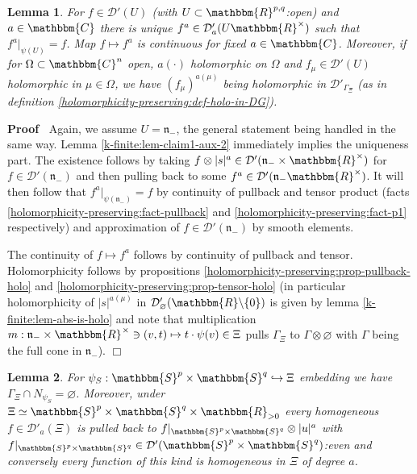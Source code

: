 \documentclass{article}
\newenvironment{proof}{\noindent\textbf{Proof\ }}{\hspace*{\fill}$\Box$\medskip}
\numberwithin{definition}{section}
\newtheorem{lemma}{Lemma}
\numberwithin{lemma}{section}
\numberwithin{proposition}{section}
{\theorembodyfont{\rmfamily}\newtheorem{remark}{Remark}
\numberwithin{remark}{section}
}
\begin{document}
\begin{lemma}
  \label{k-finite:lem-claim1}For $f \in \mathcal{D}' ( U)$ (with $U \subset
  \mathbbm{R}^{p, q}$:open) and $a \in \mathbbm{C}$ there is unique $f^a \in
  \mathcal{D}'_a ( U\mathbbm{R}^{\times})$ such that $f^a |_{\psi ( U)} = f$.
  Map $f \mapsto f^a$ is continuous for fixed $a \in \mathbbm{C}$. Moreover,
  if for $\Omega \subset \mathbbm{C}^n$ open, $a ( \cdot)$ holomorphic on
  $\Omega$ and $f_{\mu} \in \mathcal{D}' ( U)$ holomorphic in $\mu \in
  \Omega$, we have $( f_{\mu})^{a ( \mu)}$ being holomorphic in
  $\mathcal{D}'_{\Gamma_{\Xi}}$ (as in definition
  \ref{holomorphicity-preserving:def-holo-in-DG}).
\end{lemma}

\begin{proof}
  Again, we assume $U =\mathfrak{n}_-$, the general statement being handled in
  the same way. Lemma \ref{k-finite:lem-claim1-aux-2} immediately implies the
  uniqueness part. The existence follows by taking $f \otimes | s |^a \in
  \mathcal{D}' ( \mathfrak{n}_- \times \mathbbm{R}^{\times})$ for $f \in
  \mathcal{D}' ( \mathfrak{n}_-)$ and then pulling back to some $f^a \in
  \mathcal{D}' ( \mathfrak{n}_- \mathbbm{R}^{\times})$. It will then follow
  that $f^a |_{\psi ( \mathfrak{n}_-)} = f$ by continuity of pullback and
  tensor product (facts \ref{holomorphicity-preserving:fact-pullback} and
  \ref{holomorphicity-preserving:fact-p1} respectively) and approximation of
  $f \in \mathcal{D}' ( \mathfrak{n}_-)$ by smooth elements.
  
  The continuity of $f \mapsto f^a$ follows by continuity of pullback and
  tensor. Holomorphicity follows by propositions
  \ref{holomorphicity-preserving:prop-pullback-holo} and
  \ref{holomorphicity-preserving:prop-tensor-holo} (in particular
  holomorphicity of $| s |^{a ( \mu)}$ in $\mathcal{D}'_{\varnothing} (
  \mathbbm{R}\backslash \{ 0 \})$ is given by lemma
  \ref{k-finite:lem-abs-is-holo} and note that multiplication $m :
  \mathfrak{n}_- \times \mathbbm{R}^{^{} \times} \ni ( v, t) \mapsto t \cdot
  \psi ( v) \in \Xi$ pulls $\Gamma_{\Xi}$ to $\Gamma \otimes \varnothing$ with
  $\Gamma$ being the full cone in $\mathfrak{n}_-$).
\end{proof}

\begin{lemma}
  \label{k-finite:lem-restriction-to-S}For $\psi_S : \mathbbm{S}^p \times
  \mathbbm{S}^q \hookrightarrow \Xi$ embedding we have $\Gamma_{\Xi} \cap
  N_{\psi_S} = \varnothing$. Moreover, under $\Xi \simeq \mathbbm{S}^p \times
  \mathbbm{S}^q \times \mathbbm{R}_{> 0}$ every homogeneous $f \in
  \mathcal{D}'_a ( \Xi)$ is pulled back to $f |_{\mathbbm{S}^p \times
  \mathbbm{S}^q} \otimes | u |^a$ with $f |_{\mathbbm{S}^p \times
  \mathbbm{S}^q} \in \mathcal{D}' ( \mathbbm{S}^p \times \mathbbm{S}^q)$:even
  and conversely every function of this kind is homogeneous in $\Xi$ of degree
  $a$.
\end{lemma}
\end{document}
